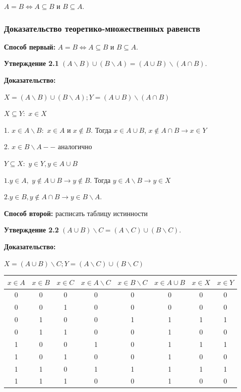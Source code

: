 \documentclass[openany]{article}
\begin{document}
   $A = B \Leftrightarrow A \subseteq B$ и $B \subseteq A$.

   \subsubsection{Доказательство теоретико-множественных равенств}

   \textbf{Способ первый:} $A = B \Leftrightarrow A \subseteq B$ и $B \subseteq A$.

   \textbf{Утверждение 2.1} $(A \backslash B) \cup (B \backslash A) = (A \cup B) \backslash (A \cap B)$.

   \textbf{Доказательство:}

   $X = (A \backslash B) \cup (B \backslash A); Y =  (A \cup B) \backslash (A \cap B)$

   $X \subseteq Y:$ $x \in X$

   1. $x \in A \backslash B:$ $x \in A$ и $x \notin B$. Тогда $x \in A \cup B$, $x \notin A \cap B \rightarrow x \in Y$

   2. $x \in B \backslash A --$ аналогично

   $Y \subseteq X:$ $y \in Y, y \in A \cup B$

   $1. y \in A,$ $y \notin A \cup B \rightarrow y \notin B$. Тогда $y \in A \backslash B \rightarrow y \in X$

   $2. y \in B, y \notin A \cap B \rightarrow y \in B \backslash A$.

   \textbf{Способ второй:} расписать таблицу истинности

   \textbf{Утверждение 2.2} $(A \cup B) \backslash C = (A \backslash C) \cup (B \backslash C)$.

   \textbf{Доказательство:} 

   $X = (A \cup B) \backslash C; Y = (A \backslash C) \cup (B \backslash C)$

   \begin{tabular}{|c|c|c|c|c|c|c|c|}
       \hline
       $x \in A$ & $x \in B$ & $x \in C$ & $x \in A \backslash C$ & $x \in B \backslash C$ & $x \in A \cup B$ & $x \in X$ & $x \in Y$ \\
       \hline
       0 & 0 & 0 & 0 & 0 & 0 & 0 & 0 \\
       \hline
       0 & 0 & 1 & 0 & 0 & 0 & 0 & 0 \\
       \hline
       0 & 1 & 0 & 0 & 1 & 1 & 1 & 1 \\
       \hline
       0 & 1 & 1 & 0 & 0 & 1 & 0 & 0 \\
       \hline
       1 & 0 & 0 & 1 & 0 & 1 & 1 & 1 \\
       \hline
       1 & 0 & 1 & 0 & 0 & 1 & 0 & 0 \\
       \hline
       1 & 1 & 0 & 1 & 1 & 1 & 1 & 1 \\
       \hline
       1 & 1 & 1 & 0 & 0 & 1 & 0 & 0 \\
       \hline
   \end{tabular}
\end{document}
